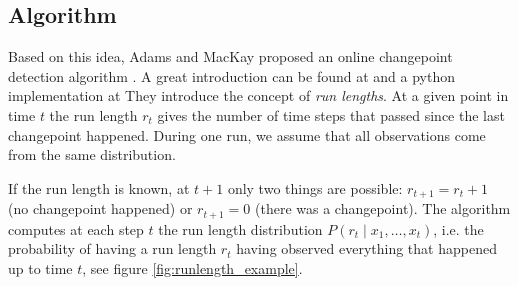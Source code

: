\documentclass[12pt,a4paper]{article}
\begin{document}
\subsection{Algorithm}

Based on this idea, Adams and MacKay proposed an online changepoint detection algorithm \cite{Adams:BayesianOnlineChangepoint}. A great introduction can be found at \cite{Gundersen:BayesianOnlineChangepoint} and a python implementation at \cite{Kulick:bayesianchangepointdetection} They introduce the concept of \textit{run lengths}. At a given point in time $t$ the run length $r_t$ gives the number of time steps that passed since the last changepoint happened. During one run, we assume that all observations come from the same distribution.

If the run length is known, at $t+1$ only two things are possible: $r_{t+1}=r_t + 1$ (no changepoint happened) or $r_{t+1}=0$ (there was a changepoint). The algorithm computes at each step $t$ the run length distribution $P(r_t \mid x_1,\dots,x_t)$, i.e. the probability of having a run length $r_t$ having observed everything that happened up to time $t$, see figure \ref{fig:runlength_example}.
\end{document}
